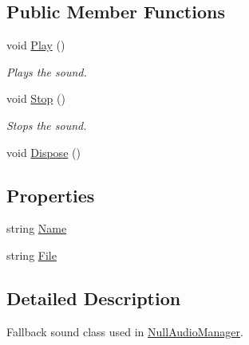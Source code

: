 \subsection*{Public Member Functions}
\begin{DoxyCompactItemize}
\item 
void \hyperlink{class_tri_devs_1_1_tri_engine2_d_1_1_audio_1_1_null_sound_a760c49962816f1ed4e6e53116045548b}{Play} ()
\begin{DoxyCompactList}\small\item\em Plays the sound. \end{DoxyCompactList}\item 
void \hyperlink{class_tri_devs_1_1_tri_engine2_d_1_1_audio_1_1_null_sound_aa88a76ec334258b60968337a00edb02c}{Stop} ()
\begin{DoxyCompactList}\small\item\em Stops the sound. \end{DoxyCompactList}\item 
void \hyperlink{class_tri_devs_1_1_tri_engine2_d_1_1_audio_1_1_null_sound_adfb4c3733aba1b38fef0db35e0e86f5a}{Dispose} ()
\end{DoxyCompactItemize}
\subsection*{Properties}
\begin{DoxyCompactItemize}
\item 
string \hyperlink{class_tri_devs_1_1_tri_engine2_d_1_1_audio_1_1_null_sound_af410987f6fe015f500abe45c2ffdf6d6}{Name}
\item 
string \hyperlink{class_tri_devs_1_1_tri_engine2_d_1_1_audio_1_1_null_sound_a4fd40e54f9c2662a95a4fdf3e71bc313}{File}
\end{DoxyCompactItemize}


\subsection{Detailed Description}
Fallback sound class used in \hyperlink{class_tri_devs_1_1_tri_engine2_d_1_1_audio_1_1_null_audio_manager}{Null\-Audio\-Manager}. 




